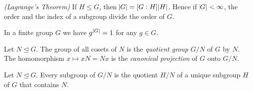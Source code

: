 \vspace{2mm}

\begin{proposition}\emph{(Lagrange's Theorem)}
	If $H \leq G$, then $\abs{G} = \intcc{G : H}\abs{H}$. Hence if $\abs{G} < \infty$, the order and the index of a subgroup divide the order of $G$.
\end{proposition}

\vspace{2mm}

\begin{theorem}
	In a finite group $G$ we have $g^{\abs[0]{G}} = 1$ for any $g \in G$.
\end{theorem}

\vspace{2mm}

\begin{definition}
	Let $N \unlhd G$. The group of all cosets of $N$ is the \emph{quotient group} $G/N$ of $G$ by $N$. The homomorphism $x \mapsto xN = Nx$ is the \emph{canonical projection} of $G$ onto $G/N$.
\end{definition}

\vspace{2mm}

\begin{proposition}
	Let $N \unlhd G$. Every subgroup of $G/N$ is the quotient $H/N$ of a unique subgroup $H$ of $G$ that contains $N$.
\end{proposition}

\vspace{2mm}





